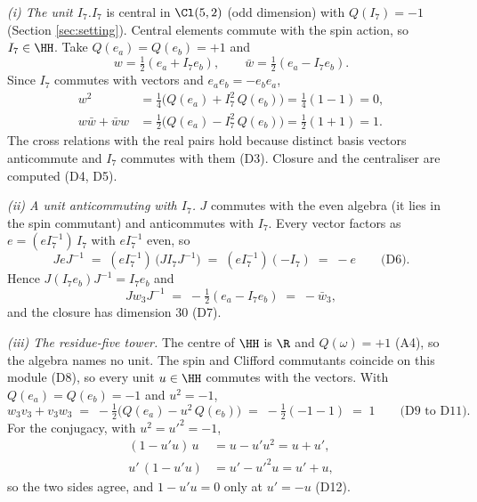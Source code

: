 \textit{(i) The unit $I_{7}$.}\enspace $I_{7}$ is central in $\Cl(5,2)$ (odd dimension) with $Q(I_{7}) = -1$ (Section \ref{sec:setting}). Central elements commute with the spin action, so $I_{7} \in \HH$. Take $Q(e_{a}) = Q(e_{b}) = +1$ and
\[
w = \tfrac{1}{2}(e_{a} + I_{7}e_{b}), \qquad \bar{w} = \tfrac{1}{2}(e_{a} - I_{7}e_{b}).
\]
Since $I_{7}$ commutes with vectors and $e_{a}e_{b} = -e_{b}e_{a}$,
\begin{align*}
w^{2} &= \tfrac{1}{4}\bigl(Q(e_{a}) + I_{7}^{2}\,Q(e_{b})\bigr) = \tfrac{1}{4}(1 - 1) = 0, \\
w\bar{w} + \bar{w}w &= \tfrac{1}{2}\bigl(Q(e_{a}) - I_{7}^{2}\,Q(e_{b})\bigr) = \tfrac{1}{2}(1 + 1) = 1.
\end{align*}
The cross relations with the real pairs hold because distinct basis vectors anticommute and $I_{7}$ commutes with them (D3). Closure and the centraliser are computed (D4, D5).



\emph{(ii) A unit anticommuting with $I_{7}$.}  $J$ commutes with the even algebra (it lies in the spin commutant) and anticommutes with $I_{7}$. Every vector factors as $e = (eI_{7}^{-1})\,I_{7}$ with $eI_{7}^{-1}$ even, so
\[
JeJ^{-1} \;=\; (eI_{7}^{-1})\,\bigl(JI_{7}J^{-1}\bigr) \;=\; (eI_{7}^{-1})(-I_{7}) \;=\; -e \qquad \text{(D6)}.
\]
Hence $J(I_{7}e_{b})J^{-1} = I_{7}e_{b}$ and
\[
Jw_{3}J^{-1} \;=\; -\tfrac{1}{2}(e_{a} - I_{7}e_{b}) \;=\; -\bar{w}_{3},
\]
and the closure has dimension $30$ (D7).



\emph{(iii) The residue-five tower.}  The centre of $\HH$ is $\R$ and $Q(\omega) = +1$ (A4), so the algebra names no unit. The spin and Clifford commutants coincide on this module (D8), so every unit $u \in \HH$ commutes with the vectors. With $Q(e_{a}) = Q(e_{b}) = -1$ and $u^{2} = -1$,
\[
w_{3}v_{3} + v_{3}w_{3} \;=\; -\tfrac{1}{2}\bigl(Q(e_{a}) - u^{2}\,Q(e_{b})\bigr) \;=\; -\tfrac{1}{2}(-1 - 1) \;=\; 1 \qquad \text{(D9 to D11)}.
\]
For the conjugacy, with $u^{2} = u'^{2} = -1$,
\begin{align*}
(1 - u'u)\,u &= u - u'u^{2} = u + u', \\
u'\,(1 - u'u) &= u' - u'^{2}u = u' + u,
\end{align*}
so the two sides agree, and $1 - u'u = 0$ only at $u' = -u$ (D12).
